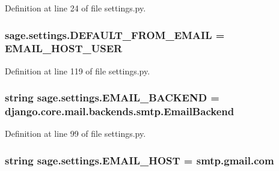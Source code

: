 Definition at line 24 of file settings.\+py.

\hypertarget{namespacesage_1_1settings_a6517c4f93850d63e2bdbe7040ad0e2ff}{}
\subsubsection[{D\+E\+F\+A\+U\+L\+T\+\_\+\+F\+R\+O\+M\+\_\+\+E\+M\+A\+I\+L}]{\setlength{\rightskip}{0pt plus 5cm}sage.\+settings.\+D\+E\+F\+A\+U\+L\+T\+\_\+\+F\+R\+O\+M\+\_\+\+E\+M\+A\+I\+L = {\bf E\+M\+A\+I\+L\+\_\+\+H\+O\+S\+T\+\_\+\+U\+S\+E\+R}}\label{namespacesage_1_1settings_a6517c4f93850d63e2bdbe7040ad0e2ff}


Definition at line 119 of file settings.\+py.

\hypertarget{namespacesage_1_1settings_a2d83ca0a279480aa03599465a0386b17}{}
\subsubsection[{E\+M\+A\+I\+L\+\_\+\+B\+A\+C\+K\+E\+N\+D}]{\setlength{\rightskip}{0pt plus 5cm}string sage.\+settings.\+E\+M\+A\+I\+L\+\_\+\+B\+A\+C\+K\+E\+N\+D = \textquotesingle{}django.\+core.\+mail.\+backends.\+smtp.\+Email\+Backend\textquotesingle{}}\label{namespacesage_1_1settings_a2d83ca0a279480aa03599465a0386b17}


Definition at line 99 of file settings.\+py.

\hypertarget{namespacesage_1_1settings_a594329fe15c9680f523afaab779411ed}{}
\subsubsection[{E\+M\+A\+I\+L\+\_\+\+H\+O\+S\+T}]{\setlength{\rightskip}{0pt plus 5cm}string sage.\+settings.\+E\+M\+A\+I\+L\+\_\+\+H\+O\+S\+T = \textquotesingle{}smtp.\+gmail.\+com\textquotesingle{}}\label{namespacesage_1_1settings_a594329fe15c9680f523afaab779411ed}


